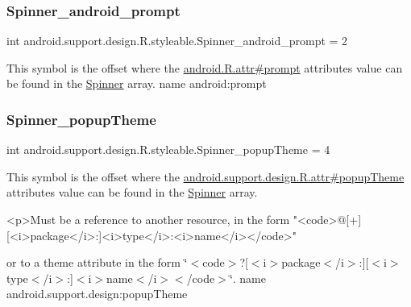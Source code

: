 \subsubsection{\texorpdfstring{Spinner\+\_\+android\+\_\+prompt}{Spinner\_android\_prompt}}
{\footnotesize\ttfamily int android.\+support.\+design.\+R.\+styleable.\+Spinner\+\_\+android\+\_\+prompt = 2\hspace{0.3cm}{\ttfamily [static]}}

This symbol is the offset where the \hyperlink{}{android.\+R.\+attr\#prompt} attribute\textquotesingle{}s value can be found in the \hyperlink{classandroid_1_1support_1_1design_1_1R_1_1styleable_ac36e55e5a1c717e866dcadd92552fa64}{Spinner} array.  name android\+:prompt \mbox{\label{classandroid_1_1support_1_1design_1_1R_1_1styleable_a59a6d161b7f6cda7fafb201a44bebca6}} 
\subsubsection{\texorpdfstring{Spinner\+\_\+popup\+Theme}{Spinner\_popupTheme}}
{\footnotesize\ttfamily int android.\+support.\+design.\+R.\+styleable.\+Spinner\+\_\+popup\+Theme = 4\hspace{0.3cm}{\ttfamily [static]}}

This symbol is the offset where the \hyperlink{classandroid_1_1support_1_1design_1_1R_1_1attr_a31e4e569ed674c1af7374b723ea84669}{android.\+support.\+design.\+R.\+attr\#popup\+Theme} attribute\textquotesingle{}s value can be found in the \hyperlink{classandroid_1_1support_1_1design_1_1R_1_1styleable_ac36e55e5a1c717e866dcadd92552fa64}{Spinner} array.

\begin{DoxyVerb}      <p>Must be a reference to another resource, in the form "<code>@[+][<i>package</i>:]<i>type</i>:<i>name</i></code>"
\end{DoxyVerb}
 or to a theme attribute in the form \char`\"{}$<$code$>$?\mbox{[}$<$i$>$package$<$/i$>$\+:\mbox{]}\mbox{[}$<$i$>$type$<$/i$>$\+:\mbox{]}$<$i$>$name$<$/i$>$$<$/code$>$\char`\"{}.  name android.\+support.\+design\+:popup\+Theme \mbox{\label{classandroid_1_1support_1_1design_1_1R_1_1styleable_a7389a923bf3e321b6b5d10b0589547a1}} 
